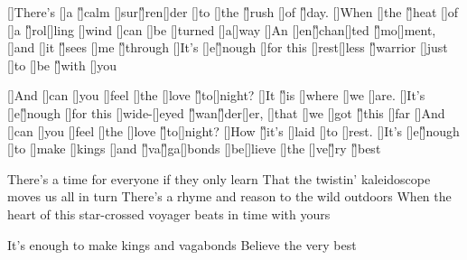 
\begin{guitar}
	[\E]There's [\Fsharp]a [\G]calm [\A]sur[\G]ren[\D]der [\E]to [\Fsharp]the [\G]rush [\A]of [\G]day.
	[\E]When [\Fsharp]the [\G]heat [\A]of [\A]a [\G]rol[\D]ling [\B]wind [\C]can [\B]be [\A]turned [\B]a[\A]way
	[\E]An [\Fsharp]en[\G]chan[\A]ted [\G]mo[\D]ment, [\E]and [\Fsharp]it [\G]sees [\A]me [\G]through
	[\E]It's [\Fsharp]e[\G]nough [\D]for this [\DD]rest[\B]less [\G]warrior [\C]just [\B]to [\A]be [\G]with [\A]you
	
	[\D]And [\DD]can [\B]you [\A]feel [\DD]the [\B]love [\G]to[\E]night? [\D]It [\G]is [\C]where [\B]we [\A]are.
	[\E]It's [\Fsharp]e[\G]nough [\D]for this [\DD]wide-[\B]eyed [\G]wan[\G]der[\E]er, [\C]that [\B]we [\A]got [\G]this [\A]far
	[\D]And [\DD]can [\B]you [\A]feel [\DD]the [\B]love [\G]to[\E]night? [\D]How [\G]it's [\C]laid [\B]to [\A]rest.
	[\E]It's [\Fsharp]e[\G]nough [\D]to [\D]make [\DD]kings [\B]and [\G]va[\G]ga[\E]bonds [\E]be[\C]lieve [\B]the [\A]ve[\G]ry [\G]best
	
	There's a time for everyone if they only learn
	That the twistin' kaleidoscope moves us all in turn
	There's a rhyme and reason to the wild outdoors
	When the heart of this star-crossed voyager beats in time with yours
	
	 
	
	It's enough to make kings and vagabonds
	Believe the very best
\end{guitar}
